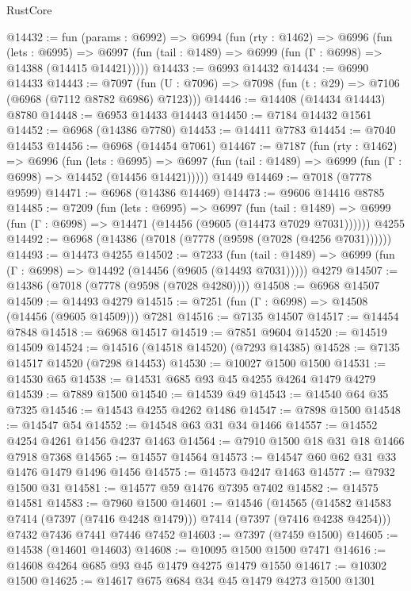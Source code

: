 \begin{lexlean}{RustCore}
\begin{coremodule}
@14432 := fun (params : @6992) =>
  @6994
    (fun (rty : @1462) =>
    @6996
      (fun (lets : @6995) =>
      @6997 (fun (tail : @1489) => @6999 (fun (Γ : @6998) => @14388 (@14415 @14421)))))
@14433 := @6993 @14432
@14434 := @6990 @14433
@14443 := @7097
    (fun (U : @7096) => @7098 (fun (t : @29) => @7106 (@6968 (@7112 @8782 @6986) @7123)))
@14446 := @14408 (@14434 @14443) @8780
@14448 := @6953 @14433 @14443
@14450 := @7184 @14432 @1561
@14452 := @6968 (@14386 @7780)
@14453 := @14411 @7783
@14454 := @7040 @14453
@14456 := @6968 (@14454 @7061)
@14467 := @7187
    (fun (rty : @1462) =>
    @6996
      (fun (lets : @6995) =>
      @6997 (fun (tail : @1489) => @6999 (fun (Γ : @6998) => @14452 (@14456 @14421)))))
    @1449
@14469 := @7018 (@7778 @9599)
@14471 := @6968 (@14386 @14469)
@14473 := @9606 @14416 @8785
@14485 := @7209
    (fun (lets : @6995) =>
    @6997
      (fun (tail : @1489) =>
      @6999 (fun (Γ : @6998) => @14471 (@14456 (@9605 (@14473 @7029 @7031))))))
    @4255
@14492 := @6968 (@14386 (@7018 (@7778 (@9598 (@7028 (@4256 @7031))))))
@14493 := @14473 @4255
@14502 := @7233
    (fun (tail : @1489) => @6999 (fun (Γ : @6998) => @14492 (@14456 (@9605 (@14493 @7031)))))
    @4279
@14507 := @14386 (@7018 (@7778 (@9598 (@7028 @4280))))
@14508 := @6968 @14507
@14509 := @14493 @4279
@14515 := @7251 (fun (Γ : @6998) => @14508 (@14456 (@9605 @14509))) @7281
@14516 := @7135 @14507
@14517 := @14454 @7848
@14518 := @6968 @14517
@14519 := @7851 @9604
@14520 := @14519 @14509
@14524 := @14516 (@14518 @14520) (@7293 @14385)
@14528 := @7135 @14517 @14520 (@7298 @14453)
@14530 := @10027 @1500 @1500
@14531 := @14530 @65
@14538 := @14531 @685 @93 @45 @4255 @4264 @1479 @4279
@14539 := @7889 @1500
@14540 := @14539 @49
@14543 := @14540 @64 @35 @7325
@14546 := @14543 @4255 @4262 @1486
@14547 := @7898 @1500
@14548 := @14547 @54
@14552 := @14548 @63 @31 @34 @1466
@14557 := @14552 @4254 @4261 @1456 @4237 @1463
@14564 := @7910 @1500 @18 @31 @18 @1466 @7918 @7368
@14565 := @14557 @14564
@14573 := @14547 @60 @62 @31 @33 @1476 @1479 @1496 @1456
@14575 := @14573 @4247 @1463
@14577 := @7932 @1500 @31
@14581 := @14577 @59 @1476 @7395 @7402
@14582 := @14575 @14581
@14583 := @7960 @1500
@14601 := @14546
    (@14565 (@14582 @14583 @7414 (@7397 (@7416 @4248 @1479))) @7414 (@7397 (@7416 @4238 @4254)))
    @7432
    @7436
    @7441
    @7446
    @7452
@14603 := @7397 (@7459 @1500)
@14605 := @14538 (@14601 @14603)
@14608 := @10095 @1500 @1500 @7471
@14616 := @14608 @4264 @685 @93 @45 @1479 @4275 @1479 @1550
@14617 := @10302 @1500
@14625 := @14617 @675 @684 @34 @45 @1479 @4273 @1500 @1301

\end{coremodule}
\end{lexlean}
